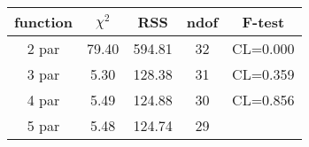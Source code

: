 \begin{tabular}{c|c|c|c|c}
function & $\chi^2$ & RSS & ndof & F-test \\
\hline
2 par & 79.40 & 594.81 & 32 & CL=0.000 \\
3 par & 5.30 & 128.38 & 31 & CL=0.359 \\
4 par & 5.49 & 124.88 & 30 & CL=0.856 \\
5 par & 5.48 & 124.74 & 29 & \\
\hline
\end{tabular}